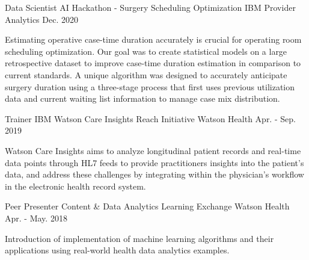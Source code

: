 

\begin{cventries}

  \cventry
    {Data Scientist} %
    {AI Hackathon - Surgery Scheduling Optimization} %
    {IBM Provider Analytics} %
    {Dec. 2020} %
    {
      \begin{cvcompactparagraph}
        Estimating operative case-time duration accurately is crucial for operating room scheduling optimization. Our goal was to create statistical models on a large retrospective dataset to improve case-time duration estimation in comparison to current standards. A unique algorithm was designed to accurately anticipate surgery duration using a three-stage process that first uses previous utilization data and current waiting list information to manage case mix distribution.
      \end{cvcompactparagraph}
    }

  \cventry
    {Trainer} %
    {IBM Watson Care Insights Reach Initiative} %
    {Watson Health} %
    {Apr. - Sep. 2019} %
    {
      \begin{cvcompactparagraph}
        Watson Care Insights aims to analyze longitudinal patient records and real-time data points through HL7 feeds to provide practitioners insights into the patient’s data, and address these challenges by integrating within the physician's workflow in the electronic health record system.
      \end{cvcompactparagraph}
    }

  \cventry
    {Peer Presenter} %
    {Content \& Data Analytics Learning Exchange} %
    {Watson Health} %
    {Apr. - May. 2018} %
    {
      \begin{cvcompactparagraph}
        Introduction of implementation of machine learning algorithms and their applications using real-world health data analytics examples.
      \end{cvcompactparagraph}
    }


\end{cventries}
